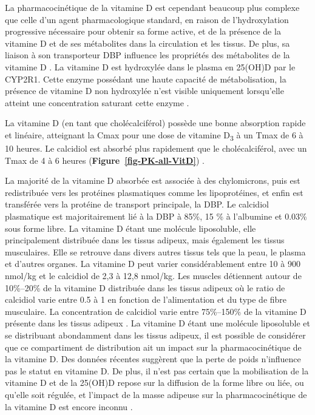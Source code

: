 \documentclass[
  a4paper,
  DIV=11,
  numbers=noendperiod,
  listof=totoc]{scrreprt}
\begin{document}
La pharmacocinétique de la vitamine D est cependant beaucoup plus
complexe que celle d'un agent pharmacologique standard, en raison de
l'hydroxylation progressive nécessaire pour obtenir sa forme active, et
de la présence de la vitamine D et de ses métabolites dans la
circulation et les tissus. De plus, sa liaison à son transporteur
\ac{DBP} influence les propriétés des métabolites de la vitamine D
\autocite{Schoenmakers.2018}. La vitamine D est hydroxylée dans le
plasma en 25(OH)D par le CYP2R1. Cette enzyme possédant une haute
capacité de métabolisation, la présence de vitamine D non hydroxylée
n'est visible uniquement lorsqu'elle atteint une concentration saturant
cette enzyme \autocite{Schoenmakers.2018}.

La vitamine D (en tant que cholécalciférol) possède une bonne absorption
rapide et linéaire, atteignant la \ac{Cmax} pour une dose de vitamine
D\textsubscript{3} à un \ac{Tmax} de 6 à 10 heures. Le calcidiol est
absorbé plus rapidement que le cholécalciférol, avec un \ac{Tmax} de 4 à
6 heures (\textbf{Figure~\ref{fig-PK-all-VitD}})
\autocite{Schoenmakers.2018}.

La majorité de la vitamine D absorbée est associée à des chylomicrons,
puis est redistribuée vers les protéines plasmatiques comme les
lipoprotéines, et enfin est transférée vers la protéine de transport
principale, la \ac{DBP}. Le calcidiol plasmatique est majoritairement
lié à la DBP à 85\%, 15 \% à l'albumine et 0.03\% sous forme libre. La
vitamine D étant une molécule liposoluble, elle principalement
distribuée dans les tissus adipeux, mais également les tissus
musculaires. Elle se retrouve dans divers autres tissus tels que la
peau, le plasma et d'autres organes. La vitamine D peut varier
considérablement entre 10 à 900 nmol/kg et le calcidiol de 2,3 à 12,8
nmol/kg. Les muscles détiennent autour de 10\%--20\% de la vitamine D
distribuée dans les tissus adipeux où le ratio de calcidiol varie entre
0.5 à 1 en fonction de l'alimentation et du type de fibre musculaire. La
concentration de calcidiol varie entre 75\%--150\% de la vitamine D
présente dans les tissus adipeux \autocite{Schoenmakers.2018}. La
vitamine D étant une molécule liposoluble et se distribuant abondamment
dans les tissus adipeux, il est possible de considérer que ce
compartiment de distribution ait un impact sur la pharmacocinétique de
la vitamine D. Des données récentes suggèrent que la perte de poids
n'influence pas le statut en vitamine D. De plus, il n'est pas certain
que la mobilisation de la vitamine D et de la 25(OH)D repose sur la
diffusion de la forme libre ou liée, ou qu'elle soit régulée, et
l'impact de la masse adipeuse sur la pharmacocinétique de la vitamine D
est encore inconnu \autocite{Schoenmakers.2018}.
\end{document}
